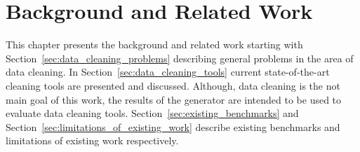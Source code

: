 
\chapter{Background and Related Work} 
\label{sec:background}

This chapter presents the background and related work starting with Section~\ref{sec:data_cleaning_problems} describing general problems in the area of data cleaning.
In Section~\ref{sec:data_cleaning_tools} current state-of-the-art cleaning tools are presented and discussed.
Although, data cleaning is the not main goal of this work, the results of the generator are intended to be used to evaluate data cleaning tools.
Section~\ref{sec:existing_benchmarks} and Section~\ref{sec:limitations_of_existing_work} describe existing benchmarks and limitations of existing work respectively.





